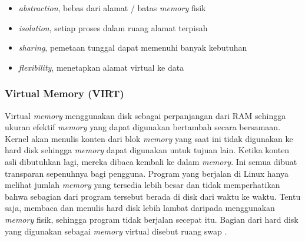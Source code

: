 \begin{itemize} [noitemsep, topsep=0pt]
    \item \textit{abstraction}, bebas dari alamat / batas \textit{memory} fisik 
    \item \textit{isolation}, setiap proses dalam ruang alamat terpisah 
    \item \textit{sharing}, pemetaan tunggal dapat memenuhi banyak kebutuhan 
    \item \textit{flexibility}, menetapkan alamat virtual ke data 
\end{itemize}



\subsubsection{Virtual Memory (VIRT)}
Virtual \textit{memory} menggunakan disk sebagai perpanjangan dari RAM sehingga ukuran efektif \textit{memory} yang dapat digunakan bertambah secara bersamaan. Kernel akan menulis konten dari blok \textit{memory} yang saat ini tidak digunakan ke hard disk sehingga \textit{memory} dapat digunakan untuk tujuan lain. Ketika konten asli dibutuhkan lagi, mereka dibaca kembali ke dalam \textit{memory}. Ini semua dibuat transparan sepenuhnya bagi pengguna. Program yang berjalan di Linux hanya melihat jumlah \textit{memory} yang tersedia lebih besar dan tidak memperhatikan bahwa sebagian dari program tersebut berada di disk dari waktu ke waktu. Tentu saja, membaca dan menulis hard disk lebih lambat daripada menggunakan \textit{memory} fisik, sehingga program tidak berjalan secepat itu. Bagian dari hard disk yang digunakan sebagai \textit{memory} virtual disebut ruang swap \cite{site:ltdp}.

